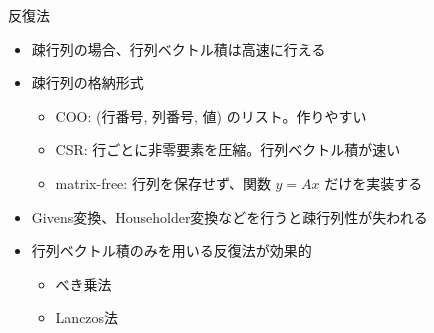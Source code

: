 \begin{frame}[t,fragile]{反復法}
  \begin{itemize}
  \item 疎行列の場合、行列ベクトル積は高速に行える
  \item 疎行列の格納形式
  \begin{itemize}
  \item COO: (行番号, 列番号, 値) のリスト。作りやすい
  \item CSR: 行ごとに非零要素を圧縮。行列ベクトル積が速い
  \item matrix-free: 行列を保存せず、関数 $y=Ax$ だけを実装する
  \end{itemize}
  \item Givens変換、Householder変換などを行うと疎行列性が失われる
  \item 行列ベクトル積のみを用いる反復法が効果的
    \begin{itemize}
    \item べき乗法
    \item Lanczos法
    \end{itemize}
  \end{itemize}
\end{frame}
